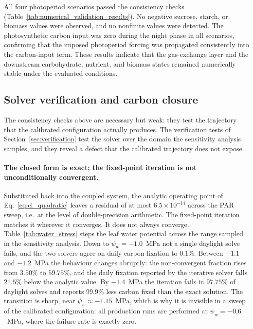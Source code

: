 \documentclass[a4paper,fleqn]{cas-sc}
\begin{document}
All four photoperiod scenarios passed the consistency checks
(Table~\ref{tab:numerical_validation_results}). No negative
sucrose, starch, or biomass values were observed, and no nonfinite values were
detected. The photosynthetic carbon input was zero during the night phase in
all scenarios, confirming that the imposed photoperiod forcing was propagated
consistently into the carbon-input term. These results indicate that the
gas-exchange layer and the downstream carbohydrate, nutrient, and biomass
states remained numerically stable under the evaluated conditions.

\subsection{Solver verification and carbon closure}
\label{sec:results_verification}

The consistency checks above are necessary but weak: they test the trajectory
that the calibrated configuration actually produces. The verification tests
of Section~\ref{sec:verification} test the solver over the domain the
sensitivity analysis samples, and they reveal a defect that the calibrated
trajectory does not expose.

\paragraph{The closed form is exact; the fixed-point iteration is not
unconditionally convergent.}
Substituted back into the coupled system, the analytic operating point of
Eq.~\eqref{eq:ci_quadratic} leaves a residual of at most
$6.5\times10^{-14}$ across the PAR sweep, i.e.\ at the level of
double-precision arithmetic. The fixed-point iteration matches it wherever it
converges. It does not always converge. Table~\ref{tab:water_stress} steps
the leaf water potential across the range sampled in the sensitivity
analysis. Down to $\psi_w = -1.0$~MPa not a single daylight solve fails, and
the two solvers agree on daily carbon fixation to $0.1\%$. Between $-1.1$ and
$-1.2$~MPa the behaviour changes abruptly: the non-convergent fraction rises
from $3.50\%$ to $59.75\%$, and the daily fixation reported by the iterative
solver falls $21.5\%$ below the analytic value. By $-1.4$~MPa the iteration
fails in $97.75\%$ of daylight solves and reports $99.9\%$ less carbon fixed
than the exact solution. The transition is sharp, near
$\psi_w \approx -1.15$~MPa, which is why it is invisible in a sweep of the
calibrated configuration: all production runs are performed at
$\psi_w = -0.6$~MPa, where the failure rate is exactly zero.
\end{document}
